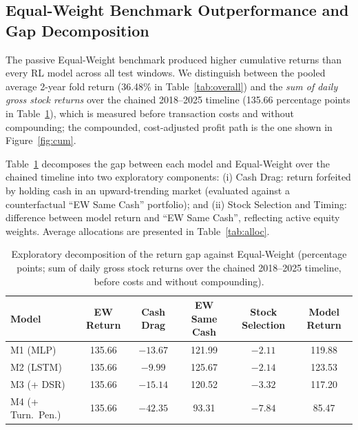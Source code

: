 \documentclass[11pt,a4paper]{article}
\numberwithin{equation}{section}
\numberwithin{table}{section}
\numberwithin{figure}{section}
\numberwithin{algorithm}{section}
\begin{document}
\subsection{Equal-Weight Benchmark Outperformance and Gap Decomposition}
The passive Equal-Weight benchmark produced higher cumulative returns than every RL model across all test windows. We distinguish between the pooled average 2-year fold return (36.48\% in Table~\ref{tab:overall}) and the \emph{sum of daily gross stock returns} over the chained 2018--2025 timeline (135.66 percentage points in Table~\ref{tab:decomp}), which is measured before transaction costs and without compounding; the compounded, cost-adjusted profit path is the one shown in Figure~\ref{fig:cum}.

Table~\ref{tab:decomp} decomposes the gap between each model and Equal-Weight over the chained timeline into two exploratory components: (i) Cash Drag: return forfeited by holding cash in an upward-trending market (evaluated against a counterfactual ``EW Same Cash'' portfolio); and (ii) Stock Selection and Timing: difference between model return and ``EW Same Cash'', reflecting active equity weights. Average allocations are presented in Table~\ref{tab:alloc}.

\begin{table}[!htbp]
\centering\small
\caption{Exploratory decomposition of the return gap against Equal-Weight (percentage points; sum of daily gross stock returns over the chained 2018--2025 timeline, before costs and without compounding).}\label{tab:decomp}
\begin{tabular}{@{}lccccc@{}}
\toprule
Model & EW Return & Cash Drag & EW Same Cash & Stock Selection & Model Return\\
\midrule
M1 (MLP) & 135.66 & $-13.67$ & 121.99 & $-2.11$ & 119.88\\
M2 (LSTM) & 135.66 & $-9.99$ & 125.67 & $-2.14$ & 123.53\\
M3 (+ DSR) & 135.66 & $-15.14$ & 120.52 & $-3.32$ & 117.20\\
M4 (+ Turn.\ Pen.) & 135.66 & $-42.35$ & 93.31 & $-7.84$ & 85.47\\
\bottomrule
\end{tabular}
\end{table}
\end{document}
